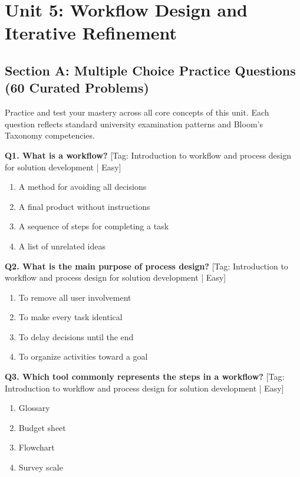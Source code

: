 \chapter{Unit 5: Workflow Design and Iterative Refinement}


\section{Section A: Multiple Choice Practice Questions (60 Curated Problems)}

\noindent Practice and test your mastery across all core concepts of this unit. Each question reflects standard university examination patterns and Bloom's Taxonomy competencies.
\vspace{3mm}

\noindent\textbf{Q1. What is a workflow?} \hfill [Tag: Introduction to workflow and process design for solution development | Easy]
\begin{enumerate}[label=(\alph*),topsep=2pt,itemsep=1pt,partopsep=0pt,parsep=0pt]
    \item {A method for avoiding all decisions}
    \item {A final product without instructions}
    \item {A sequence of steps for completing a task}
    \item {A list of unrelated ideas}
\end{enumerate}
\vspace{2mm}

\noindent\textbf{Q2. What is the main purpose of process design?} \hfill [Tag: Introduction to workflow and process design for solution development | Easy]
\begin{enumerate}[label=(\alph*),topsep=2pt,itemsep=1pt,partopsep=0pt,parsep=0pt]
    \item {To remove all user involvement}
    \item {To make every task identical}
    \item {To delay decisions until the end}
    \item {To organize activities toward a goal}
\end{enumerate}
\vspace{2mm}

\noindent\textbf{Q3. Which tool commonly represents the steps in a workflow?} \hfill [Tag: Introduction to workflow and process design for solution development | Easy]
\begin{enumerate}[label=(\alph*),topsep=2pt,itemsep=1pt,partopsep=0pt,parsep=0pt]
    \item {Glossary}
    \item {Budget sheet}
    \item {Flowchart}
    \item {Survey scale}
\end{enumerate}
\vspace{2mm}

